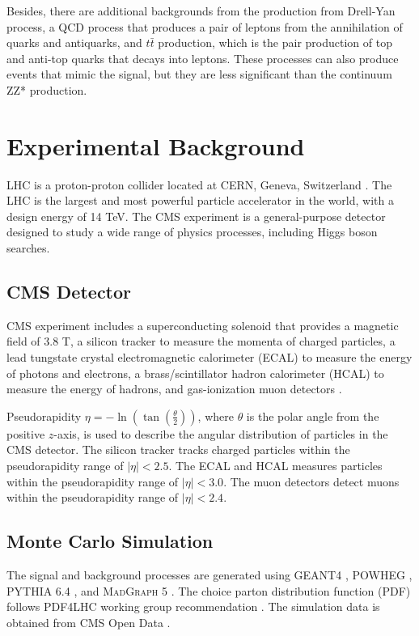 Besides, there are additional backgrounds from the production from Drell-Yan process, a QCD process that produces a pair of leptons from the annihilation of quarks and antiquarks, and $t\bar{t}$ production, which is the pair production of top and anti-top quarks that decays into leptons. 
These processes can also produce events that mimic the signal, but they are less significant than the continuum ZZ* production. 


\section{Experimental Background}
LHC is a proton-proton collider located at CERN, Geneva, Switzerland \cite{CMS:2012qbp}. The LHC is the largest and most powerful particle accelerator in the world, with a design energy of 14 TeV. The CMS experiment is a general-purpose detector designed to study a wide range of physics processes, including Higgs boson searches.

\subsection{CMS Detector}
CMS experiment includes a superconducting solenoid that provides a magnetic field of 3.8 T, a silicon tracker to measure the momenta of charged particles, a lead tungstate crystal electromagnetic calorimeter (ECAL) to measure the energy of photons and electrons, a brass/scintillator hadron calorimeter (HCAL) to measure the energy of hadrons, and gas-ionization muon detectors \cite{CMS:2012qbp}. 

Pseudorapidity $\eta=-\ln(\tan(\frac{\theta}{2}))$, where $\theta$ is the polar angle from the positive $z$-axis, is used to describe the angular distribution of particles in the CMS detector. The silicon tracker tracks charged particles within the pseudorapidity range of $|\eta| < 2.5$. The ECAL and HCAL measures particles within the pseudorapidity range of $|\eta| < 3.0$. The muon detectors detect muons within the pseudorapidity range of $|\eta| < 2.4$. 


\subsection{Monte Carlo Simulation}
The signal and background processes are generated using \textsc{GEANT4} \cite{Agostinelli:2002hh}, \textsc{POWHEG} \cite{Alioli:2010xd}, \textsc{PYTHIA} 6.4 \cite{Sjostrand:2006za}, and \textsc{MadGraph} 5 \cite{Alwall:2007st}. The choice parton distribution function (PDF) follows \textsc{PDF4LHC} working group recommendation \cite{Botje:2011sn,Alekhin:2011sk,Lai:2010vv,Ball:2011mu}. The simulation data is obtained from CMS Open Data \cite{CMS_2010_data,MIT:Higgs4L2020,Hu2020HiggsTo4L}. 

